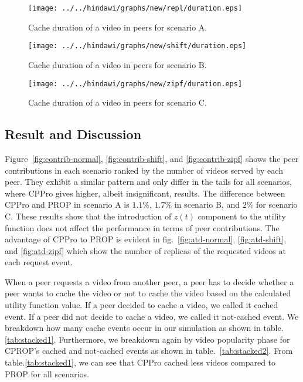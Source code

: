 \begin{figure}[!t]
\begin{center}
\texttt{[image: ../../hindawi/graphs/new/repl/duration.eps]}
\end{center}
\caption{Cache duration of a video in peers for scenario A.}
\label{fig:duration-normal}
\end{figure}

\begin{figure}[!t]
\begin{center}
\texttt{[image: ../../hindawi/graphs/new/shift/duration.eps]}
\end{center}
\caption{Cache duration of a video in peers for scenario B.}
\label{fig:duration-shift}
\end{figure}

\begin{figure}[!t]
\begin{center}
\texttt{[image: ../../hindawi/graphs/new/zipf/duration.eps]}
\end{center}
\caption{Cache duration of a video in peers for scenario C.}
\label{fig:duration-zipf}
\end{figure}


\subsection{Result and Discussion}\label{resultanddiscussion}

Figure~\ref{fig:contrib-normal}, \ref{fig:contrib-shift}, and \ref{fig:contrib-zipf} shows the peer contributions in each scenario ranked by the number of videos served by each peer.
They exhibit a similar pattern and only differ in the tails for all scenarios, where CPPro gives higher, albeit insignificant, results.
The difference between CPPro and PROP in scenario A is $1.1\%$, $1.7\%$ in scenario B, and $2\%$ for scenario C.
These results show that the introduction of $z(t)$ component to the utility function does not affect the performance in terms of peer contributions.
The advantage of CPPro to PROP is evident in fig.~\ref{fig:atd-normal}, \ref{fig:atd-shift}, and \ref{fig:atd-zipf} which show the number of replicas of the requested videos at each request event.


When a peer requests a video from another peer, a peer has to decide whether a peer wants to cache the video or not to cache the video based on the calculated utility function value.  
If a peer decided to cache a video, we called it cached event.
If a peer did not decide to cache a video, we called it not-cached event.
We breakdown how many cache events occur in our simulation as shown in table.\ref{tab:stacked1}.
Furthermore, we breakdown again by video popularity phase for CPROP's cached and not-cached events as shown in table.~\ref{tab:stacked2}.
From table.\ref{tab:stacked1}, we can see that CPPro cached less videos compared to PROP for all scenarios.

